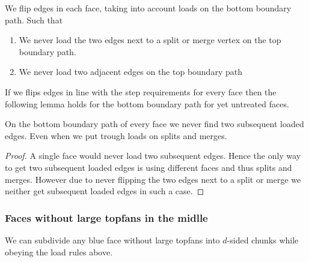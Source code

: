   We flip edges in each face, taking into account loads on the bottom boundary path. Such that

  \begin{enumerate}
    \item We never load the two edges next to a split or merge vertex on the top boundary path.
    \item We never load two adjacent edges on the top boundary path
  \end{enumerate}

  If we flips edges in line with the step requirements for every face then the following lemma holds for the bottom boundary path for yet untreated faces.

  \begin{lemma}
    \label{lm:}
    On the bottom boundary path of every face we never find two subsequent loaded edges. Even when we put trough loads on splits and merges.
  \end{lemma}
  \begin{proof}
    A single face would never load two subsequent edges. Hence the only way to get two subsequent loaded edges is using different faces and thus splits and merges.
    However due to never flipping the two edges next to a split or merge we neither get subsequent loaded edges in such a case.
  \end{proof}


\subsubsection{Faces without large topfans in the midlle}
  \begin{lemma}
    \label{lm:subdiv:withoutTopfan}
    We can subdivide any blue face without large topfans into $d$-sided chunks while obeying the load rules above.
  \end{lemma}

